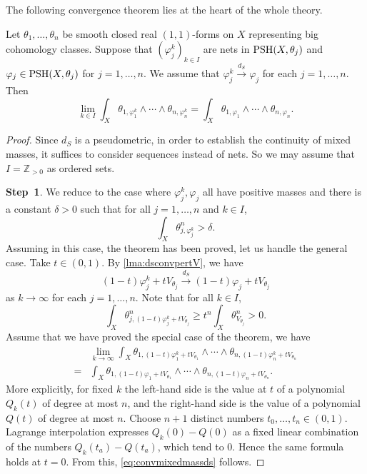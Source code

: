 The following convergence theorem lies at the heart of the whole theory.
\begin{theorem}\label{thm:convdS}
    Let $\theta_1,\ldots,\theta_n$ be smooth closed real $(1,1)$-forms on $X$ representing big cohomology classes. Suppose that $(\varphi_j^k)_{k\in I}$ are nets in $\mathrm{PSH}(X,\theta_j)$ and $\varphi_j\in \mathrm{PSH}(X,\theta_j)$ for $j=1,\ldots,n$. We assume that $\varphi_j^k\xrightarrow{d_S}\varphi_j$ for each $j=1,\ldots,n$. Then
    \begin{equation}\label{eq:convmixedmassds}
        \lim_{k\in I}\int_X\theta_{1,\varphi_1^k}\wedge\cdots\wedge \theta_{n,\varphi_n^k}=\int_X\theta_{1,\varphi_1}\wedge\cdots\wedge \theta_{n,\varphi_n}.
    \end{equation}
\end{theorem}
\begin{proof}
Since $d_S$ is a pseudometric, in order to establish the continuity of mixed masses, it suffices to consider sequences instead of nets. So we may assume that $I=\mathbb{Z}_{>0}$ as ordered sets.

\textbf{Step~1}. We reduce to the case where $\varphi_j^k,\varphi_j$ all have positive masses and there is a constant $\delta>0$ such that for all $j=1,\ldots,n$ and $k\in I$,
	\[
		\int_X \theta_{j,\varphi_j^k}^n>\delta.
	\]
    Assuming in this case, the theorem has been proved, let us handle the general case.
    Take $t\in (0,1)$.
    By \cref{lma:dsconvpertV}, we have
    \[
    (1-t)\varphi_j^k+tV_{\theta_j}\xrightarrow{d_S}(1-t)\varphi_j+tV_{\theta_j}
    \]
    as $k\to\infty$ for each $j=1,\ldots,n$.
    Note that for all $k\in I$,
    \[
        \int_X \theta^n_{j,(1-t)\varphi_j^k+tV_{\theta_j}}\geq t^n\int_X \theta_{V_{\theta_j}}^n>0.
    \]
    Assume that we have proved the special case of the theorem, we have
    \[
    \begin{split}
    &\lim_{k\to\infty}\int_X\theta_{1,(1-t)\varphi_1^k+tV_{\theta_1}}\wedge\cdots\wedge \theta_{n,(1-t)\varphi_n^k+tV_{\theta_n}}\\
    =&\int_X\theta_{1,(1-t)\varphi_1+tV_{\theta_1}}\wedge\cdots\wedge \theta_{n,(1-t)\varphi_n+tV_{\theta_n}}.
    \end{split}
    \]
    More explicitly, for fixed $k$ the left-hand side is the value at $t$ of a polynomial $Q_k(t)$ of degree at most $n$, and the right-hand side is the value of a polynomial $Q(t)$ of degree at most $n$. Choose $n+1$ distinct numbers $t_0,\ldots,t_n\in (0,1)$. Lagrange interpolation expresses $Q_k(0)-Q(0)$ as a fixed linear combination of the numbers $Q_k(t_a)-Q(t_a)$, which tend to $0$. Hence the same formula holds at $t=0$.
    From this, \eqref{eq:convmixedmassds} follows.




\end{proof}
